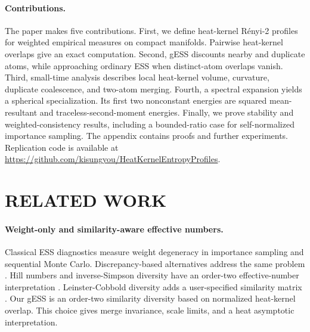 \documentclass[twoside]{article}
\theoremstyle{definition}
\theoremstyle{remark}
\begin{document}
\paragraph{Contributions.}
The paper makes five contributions. First, we define heat-kernel R\'enyi-2 profiles for weighted empirical measures on compact manifolds. Pairwise heat-kernel overlaps give an exact computation. Second, gESS discounts nearby and duplicate atoms, while approaching ordinary ESS when distinct-atom overlaps vanish. Third, small-time analysis describes local heat-kernel volume, curvature, duplicate coalescence, and two-atom merging. Fourth, a spectral expansion yields a spherical specialization. Its first two nonconstant energies are squared mean-resultant and traceless-second-moment energies. Finally, we prove stability and weighted-consistency results, including a bounded-ratio case for self-normalized importance sampling. The appendix contains proofs and further experiments. Replication code is available at \url{https://github.com/kisungyou/HeatKernelEntropyProfiles}.

\section{RELATED WORK}\label{sec:related-work}

\paragraph{Weight-only and similarity-aware effective numbers.}
Classical ESS diagnostics measure weight degeneracy in importance sampling and sequential Monte Carlo. Discrepancy-based alternatives address the same problem \citep{martino_2017_EffectiveSampleSize}. Hill numbers and inverse-Simpson diversity have an order-two effective-number interpretation \citep{hill_1973_DiversityEvennessUnifying}. Leinster-Cobbold diversity adds a user-specified similarity matrix \citep{leinster_2012_MeasuringDiversityImportance}. Our gESS is an order-two similarity diversity based on normalized heat-kernel overlap. This choice gives merge invariance, scale limits, and a heat asymptotic interpretation.
\end{document}
